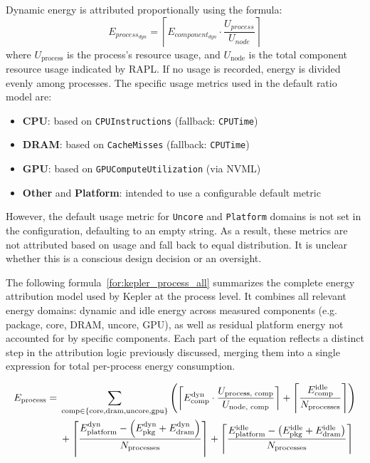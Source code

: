 Dynamic energy is attributed proportionally using the formula:
\begin{equation}
E_{process_{dyn}} = \left\lceil E_{component_{dyn}} \cdot \frac{U_{process}}{U_{node}} \right\rceil
\end{equation}
where $U_{\text{process}}$ is the process's resource usage, and $U_{\text{node}}$ is the total component resource usage indicated by RAPL. If no usage is recorded, energy is divided evenly among processes. The specific usage metrics used in the default ratio model are:
\begin{itemize}
  \item \textbf{CPU}: based on \texttt{CPUInstructions} (fallback: \texttt{CPUTime})
  \item \textbf{DRAM}: based on \texttt{CacheMisses} (fallback: \texttt{CPUTime})
  \item \textbf{GPU}: based on \texttt{GPUComputeUtilization} (via NVML)
  \item \textbf{Other} and \textbf{Platform}: intended to use a configurable default metric
\end{itemize}
However, the default usage metric for \texttt{Uncore} and \texttt{Platform} domains is not set in the configuration, defaulting to an empty string. As a result, these metrics are not attributed based on usage and fall back to equal distribution. It is unclear whether this is a conscious design decision or an oversight.

The following formula~\ref{for:kepler_process_all} summarizes the complete energy attribution model used by Kepler at the process level. It combines all relevant energy domains: dynamic and idle energy across measured components (e.g. package, core, DRAM, uncore, GPU), as well as residual platform energy not accounted for by specific components. Each part of the equation reflects a distinct step in the attribution logic previously discussed, merging them into a single expression for total per-process energy consumption.

\begin{align}
    \label{for:kepler_process_all}
    E_{\text{process}} = \; &
    \sum_{\text{comp} \in \{\text{core}, \text{dram}, \text{uncore}, \text{gpu}\}} 
    \left(
    \left\lceil 
    E_{\text{comp}}^{\text{dyn}} \cdot \frac{U_{\text{process, comp}}}{U_{\text{node, comp}}} 
    \right\rceil
    + 
    \left\lceil 
    \frac{E_{\text{comp}}^{\text{idle}}}{N_{\text{processes}}} 
    \right\rceil
    \right) \notag \\
    & + 
    \left\lceil 
    \frac{E_{\text{platform}}^{\text{dyn}}  - \left(E_{\text{pkg}}^{\text{dyn}}  + E_{\text{dram}}^{\text{dyn}} \right)}{N_{\text{processes}}} 
    \right\rceil
    + 
    \left\lceil 
    \frac{E_{\text{platform}}^{\text{idle}}  - \left(E_{\text{pkg}}^{\text{idle}}  + E_{\text{dram}}^{\text{idle}} \right)}{N_{\text{processes}}} 
    \right\rceil
\end{align}

